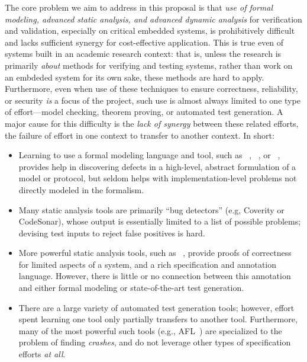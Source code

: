 The core problem we aim to address in this proposal is that \emph{use of formal modeling, advanced static analysis, and advanced dynamic analysis} for verification and validation, especially on critical embedded systems, is prohibitively difficult and lacks sufficient synergy for cost-effective application.  This is true even of systems built in an academic research context: that is, unless the research is primarily \emph{about} methods for verifying and testing systems, rather than work on an embdeded system for its own sake, these methods are hard to apply.  Furthermore, even when use of these techniques to ensure correctness, reliability, or security \emph{is} a focus of the project, such use is almost always limited to one type of effort---model checking, theorem proving, or automated test generation.  A major cause for this difficulty is the \emph{lack of synergy} between these related efforts, the failure of effort in one context to transfer to another context.  In short:

\begin{itemize}[labelsep=3pt,leftmargin=12pt]
\item Learning to use a formal modeling language and tool, such as \uppaal~\cite{uppaal}, \prism~\cite{KNP2011:CAV}, or \spin~\cite{SPIN}, provides help in discovering defects in a high-level, abstract formulation of a model or protocol, but seldom helps with implementation-level problems not directly modeled in the formalism.
\item Many static analysis tools are primarily ``bug detectors'' (e.g, Coverity or CodeSonar), whose output is essentially limited to a list of possible problems; devising test inputs to reject false positives is hard.
\item More powerful static analysis tools, such as \framac~\cite{KKP2015:FAC}, provide proofs of correctness for limited aspects of a system, and a rich specification and annotation language.  However, there is little or no connection between this annotation and either formal modeling or state-of-the-art test generation.
\item There are a large variety of automated test generation tools; however, effort spent learning one tool only partially transfers to another tool.  Furthermore, many of the most powerful such tools (e.g., AFL~\cite{aflfuzz}) are specialized to the problem of finding \emph{crashes}, and do not leverage  other types of specification efforts \emph{at all}.
\end{itemize}

